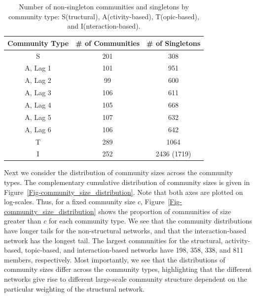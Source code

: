 \begin{table}[ht]
	\caption{Number of non-singleton communities and singletons by community type: S(tructural), A(ctivity-based), T(opic-based), and I(nteraction-based).}
	\centering
	\begin{tabular}{| c | c | c |}
		\hline Community Type & \# of Communities & \# of Singletons \\ \hline
		S & 201 & 308 \\
		A, Lag 1 & 101 & 951 \\
		A, Lag 2 & 99 & 600 \\
		A, Lag 3 & 106 & 611 \\
		A, Lag 4 & 105 & 668 \\
		A, Lag 5 & 107 & 632 \\
		A, Lag 6 & 106 & 642 \\
		T & 289 & 1064 \\
		I & 252 & 2436 (1719) \\ \hline
	\end{tabular}
	\label{Table-comm_count}
\end{table}

Next we consider the distribution of community sizes across the community types. The complementary cumulative distribution of community sizes is given in Figure~\ref{Fig-community_size_distribution}. Note that both axes are plotted on log-scales. Thus, for a fixed community size $c$, Figure~\ref{Fig-community_size_distribution} shows the proportion of communities of size greater than $c$ for each community type. We see that the community distributions have longer tails for the non-structural networks, and that the interaction-based network has the longest tail. The largest communities for the structural, activity-based, topic-based, and interaction-based networks have 198, 358, 338, and 811 members, respectively. Most importantly, we see that the distributions of community sizes differ across the community types, highlighting that the different networks give rise to different large-scale community structure dependent on the particular weighting of the structural network.

